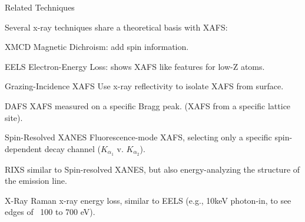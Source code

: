 \begin{slide}{Related Techniques}

    \vmm
    
    Several x-ray techniques share a theoretical basis with XAFS:
    \begin{entry} %

      \pause
    \item[{{XMCD}}]   Magnetic Dichroism: add spin information.
      \pause

    \item[{{EELS}}] Electron-Energy Loss: shows XAFS like features for low-Z
      atoms.

      \pause
    \item[Grazing-Incidence XAFS] Use x-ray reflectivity to isolate XAFS
      from surface.

      \pause
    \item[{{DAFS}}] XAFS measured on a specific Bragg peak.
      (XAFS from a specific lattice site).
      
      \pause
    \item[{{Spin-Resolved XANES}}]  Fluorescence-mode XAFS, selecting
      only a specific spin-dependent decay channel ($K_{\alpha_1}$
      v. $K_{\alpha_2}$).

      \pause
    \item[{{RIXS}}] similar to Spin-resolved XANES, but also
      energy-analyzing the structure of the emission line.
      
      \pause
    \item[{{X-Ray Raman}}] x-ray energy loss, similar to EELS (e.g.,
      10keV photon-in, to see edges of ~100 to 700 eV).
    
    \end{entry} %
\vfill
\end{slide} 
